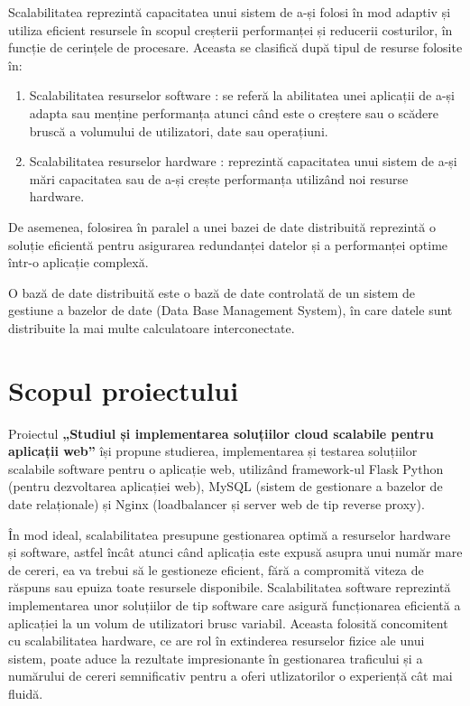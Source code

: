 \documentclass[12pt, a4paper, oneside, romanian]{teza-upb}
\begin{document}
	Scalabilitatea \cite{scal} reprezintă capacitatea unui sistem de a-și folosi în mod adaptiv și utiliza eficient resursele în scopul creșterii performanței și reducerii costurilor, în funcție de cerințele de procesare. Aceasta se clasifică după tipul de resurse folosite în: 
	\begin{enumerate}
		\item Scalabilitatea resurselor software \cite{scal.soft}: se referă la abilitatea unei aplicații de a-și adapta sau menține performanța atunci când este o creștere sau o scădere bruscă a volumului de utilizatori, date sau operațiuni. 
		
		\item Scalabilitatea resurselor hardware \cite{scal.hard}: reprezintă capacitatea unui sistem de a-și mări capacitatea sau de a-și crește performanța utilizând noi resurse hardware. 
	\end{enumerate}
	De asemenea, folosirea în paralel a unei bazei de date distribuită reprezintă o soluție eficientă pentru asigurarea redundanței datelor și a performanței optime într-o aplicație complexă. 
	
	O bază de date distribuită \cite{bd} este o bază de date controlată de un sistem de gestiune a bazelor de date (Data Base Management System), în care datele sunt distribuite la mai multe calculatoare interconectate.
	
	\section{Scopul proiectului}
	Proiectul \textbf{„Studiul și implementarea soluțiilor cloud scalabile pentru aplicații web”} își propune studierea, implementarea și testarea soluțiilor scalabile software pentru o aplicație web, utilizând framework-ul Flask Python (pentru dezvoltarea aplicației web), MySQL (sistem de gestionare a bazelor de date relaționale) și Nginx (loadbalancer și server web de tip reverse proxy). 
	
	În mod ideal, scalabilitatea presupune gestionarea optimă a resurselor hardware și software, astfel încât atunci când aplicația este expusă asupra unui număr mare de cereri, ea va trebui să le gestioneze eficient, fără a compromită viteza de răspuns sau epuiza toate resursele disponibile. Scalabilitatea software \cite{ss} reprezintă implementarea unor soluțiilor de tip software care asigură funcționarea eficientă a aplicației la un volum de utilizatori brusc variabil. Aceasta folosită concomitent cu scalabilitatea hardware, ce are rol în extinderea resurselor fizice ale unui sistem, poate aduce la rezultate impresionante în gestionarea traficului și a numărului de cereri semnificativ pentru a oferi utlizatorilor o experiență cât mai fluidă.
	
\end{document}
